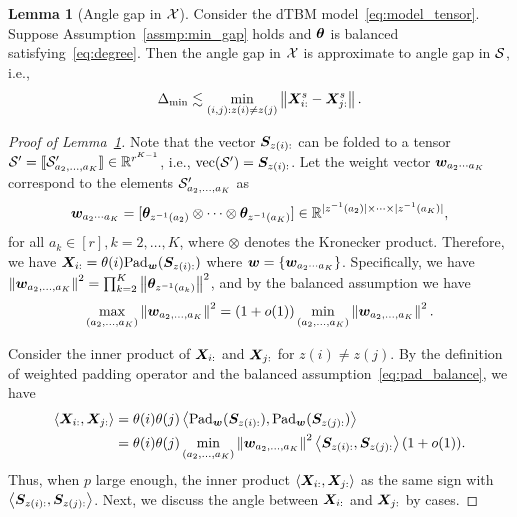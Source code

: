 \documentclass[lettersize,journal]{IEEEtran}
\theoremstyle{definition}
\newtheorem{lem}{Lemma}
\theoremstyle{definition}
\newcommand{\ang}[1]{\left\langle#1\right\rangle}
\begin{document}
\begin{lem}[Angle gap in $\mathcal{X}$]\label{lem:angle_gap_x} Consider the dTBM model~\eqref{eq:model_tensor}. Suppose Assumption~\ref{assmp:min_gap} holds and $\boldsymbol{\theta}$ is balanced satisfying~\eqref{eq:degree}. Then the angle gap in $\mathcal{X}$ is approximate to angle gap in $\mathcal{S}$, i.e.,
\begin{equation}
    \Delta_{\min} \lesssim  \min_{(i,j): z(i) \neq z(j)} \left\lVert\bm X_{i:}^s - \bm X_{j:}^s\right\rVert. 
\end{equation}
\end{lem}

\begin{proof}[Proof of Lemma~\ref{lem:angle_gap_x}] 
Note that the vector $\bm S_{z(i):}$ can be folded to a tensor $\mathcal{S}' =\llbracket \mathcal{S}'_{a_2,\ldots,a_K} \rrbracket \in \mathbb{R}^{r^{K-1}}$, i.e., $\text{vec}(\mathcal{S}') = \bm S_{z(i):}$. Let the weight vector $\bm{w}_{a_2 \cdots a_K}$ correspond to the elements $\mathcal{S}'_{a_2,\ldots,a_K}$ as
\begin{equation}
    \bm{w}_{a_2 \cdots a_K} = [ \boldsymbol{\theta}_{z^{-1} (a_2)} \otimes \cdots \otimes \boldsymbol{\theta}_{z^{-1} (a_K)}] \in \mathbb{R}^{|z^{-1} (a_2)| \times \cdots \times |z^{-1} (a_K)|},
\end{equation}
for all $a_k \in [r], k = 2,\ldots, K$, where $\otimes$ denotes the Kronecker product. Therefore, we have  $\bm X_{i:} = \theta(i) \text{Pad}_{\bm{w}}(\bm S_{z(i):})$ where $\bm{w} = \{ \bm{w}_{a_2 \cdots a_K}\}$. Specifically, we have $\left\lVert\bm{w}_{a_2,\ldots,a_K}\right\rVert^2 = \prod_{k = 2}^K \left\lVert \boldsymbol{\theta}_{z^{-1}(a_k)}\right\rVert^2$, and by the balanced assumption we have 
\begin{equation}\label{eq:pad_balance}
    \max_{(a_2,\ldots, a_K)} \onorm{\mw_{a_2,\ldots, a_K}}^2 = (1 + o(1))  \min_{(a_2,\ldots, a_K)} \onorm{\mw_{a_2,\ldots, a_K}}^2.
\end{equation}

Consider the inner product of $\bm X_{i:}$ and $\bm X_{j:}$ for $z(i) \neq z(j)$. By the definition of weighted padding operator and the balanced assumption~\eqref{eq:pad_balance}, we have 
\begin{align}
    \ang{\mX_{i:},\mX_{j:}} &= \theta(i) \theta(j) \ang{ \pad_{\mw}(\mS_{z(i):}), \pad_{\mw}(\mS_{z(j):} )}\\
    &= \theta(i) \theta(j) \min_{(a_2,\ldots, a_K)} \onorm{\mw_{a_2,\ldots, a_K}}^2 \ang{\mS_{z(i):}, \mS_{z(j):}}(1 + o(1)).
\end{align}
Thus, when $p$ large enough, the inner product $\ang{\mX_{i:},\mX_{j:}} $ as the same sign with $\ang{\mS_{z(i):}, \mS_{z(j):}}$. Next, we discuss the angle between $\bm X_{i:}$ and $\bm X_{j:}$ by cases.


\end{proof}
\end{document}
